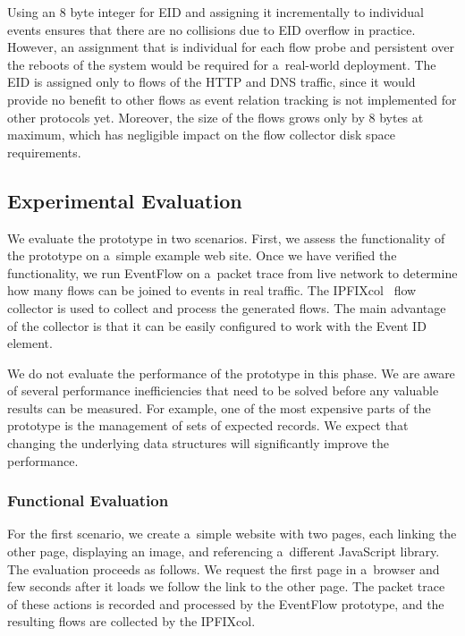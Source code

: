 Using an 8 byte integer for EID and assigning it incrementally to individual events ensures that there are no collisions due to EID overflow in practice. However, an assignment that is individual for each flow probe and persistent over the reboots of the system would be required for a~real-world deployment. The EID is assigned only to flows of the HTTP and DNS traffic, since it would provide no benefit to other flows as event relation tracking is not implemented for other protocols yet. Moreover, the size of the flows grows only by 8 bytes at maximum, which has negligible impact on the flow collector disk space requirements.


\subsection{Experimental Evaluation} \label{subsec:eventflow-evaluation}

We evaluate the prototype in two scenarios. First, we assess the functionality of the prototype on a~simple example web site. Once we have verified the functionality, we run EventFlow on a~packet trace from live network to determine how many flows can be joined to events in real traffic. The IPFIXcol~\cite{Velan-2012-Flow} flow collector is used to collect and process the generated flows. The main advantage of the collector is that it can be easily configured to work with the Event ID element.

We do not evaluate the performance of the prototype in this phase. We are aware of several performance inefficiencies that need to be solved before any valuable results can be measured. For example, one of the most expensive parts of the prototype is the management of sets of expected records. We expect that changing the underlying data structures will significantly improve the performance.

\subsubsection{Functional Evaluation}
For the first scenario, we create a~simple website with two pages, each linking the other page, displaying an image, and referencing a~different JavaScript library. The evaluation proceeds as follows. We request the first page in a~browser and few seconds after it loads we follow the link to the other page. The packet trace of these actions is recorded and processed by the EventFlow prototype, and the resulting flows are collected by the IPFIXcol.


